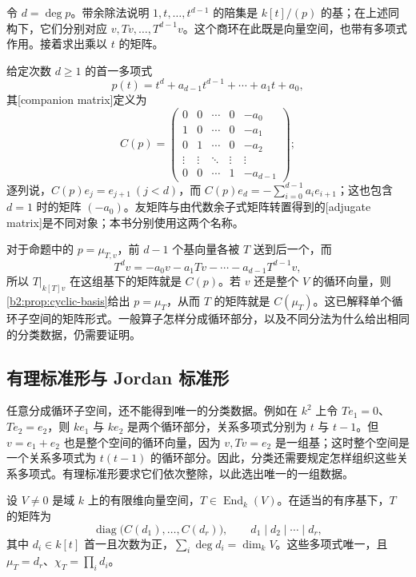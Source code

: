 令 \(d=\deg p\)。带余除法说明 \(1,t,\ldots,t^{d-1}\) 的陪集是 \(k[t]/(p)\) 的基；在上述同构下，它们分别对应 \(v,Tv,\ldots,T^{d-1}v\)。这个商环在此既是向量空间，也带有多项式作用。接着求出乘以 \(t\) 的矩阵。

\ProseParagraphBreak
给定次数 \(d\ge1\) 的首一多项式
\[
	p(t)=t^d+a_{d-1}t^{d-1}+\cdots+a_1t+a_0,
\]
其[companion matrix]定义为
\[
	C(p)=
	\begin{pmatrix}
		0&0&\cdots&0&-a_0\\
		1&0&\cdots&0&-a_1\\
		0&1&\cdots&0&-a_2\\
		\vdots&\vdots&\ddots&\vdots&\vdots\\
		0&0&\cdots&1&-a_{d-1}
	\end{pmatrix};
\]
逐列说，\(C(p)e_j=e_{j+1}\ (j<d)\)，而 \(C(p)e_d=-\sum_{i=0}^{d-1}a_ie_{i+1}\)；这也包含 \(d=1\) 时的矩阵 \((-a_0)\)。友矩阵与由代数余子式矩阵转置得到的[adjugate matrix]是不同对象；本书分别使用这两个名称。

\ProseParagraphBreak
对于命题中的 \(p=\mu_{T,v}\)，前 \(d-1\) 个基向量各被 \(T\) 送到后一个，而
\[
	T^dv=-a_0v-a_1Tv-\cdots-a_{d-1}T^{d-1}v,
\]
所以 \(T|_{k[T]v}\) 在这组基下的矩阵就是 \(C(p)\)。若 \(v\) 还是整个 \(V\) 的循环向量，则\cref{b2:prop:cyclic-basis}给出 \(p=\mu_T\)，从而 \(T\) 的矩阵就是 \(C(\mu_T)\)。这已解释单个循环子空间的矩阵形式。一般算子怎样分成循环部分，以及不同分法为什么给出相同的分类数据，仍需要证明。

\subsection{有理标准形与 Jordan 标准形}
\label{b2:subsec:0104:03}

任意分成循环子空间，还不能得到唯一的分类数据。例如在 \(k^2\) 上令 \(Te_1=0\)、\(Te_2=e_2\)，则 \(ke_1\) 与 \(ke_2\) 是两个循环部分，关系多项式分别为 \(t\) 与 \(t-1\)。但 \(v=e_1+e_2\) 也是整个空间的循环向量，因为 \(v,Tv=e_2\) 是一组基；这时整个空间是一个关系多项式为 \(t(t-1)\) 的循环部分。因此，分类还需要规定怎样组织这些关系多项式。有理标准形要求它们依次整除，以此选出唯一的一组数据。

\begin{claim}[有理标准形]\label{b2:claim:rational-canonical-goal}
	设 \(V\ne0\) 是域 \(k\) 上的有限维向量空间，\(T\in\operatorname{End}_k(V)\)。在适当的有序基下，\(T\) 的矩阵为
	\[
		\operatorname{diag}\bigl(C(d_1),\ldots,C(d_r)\bigr), \qquad d_1\mid d_2\mid\cdots\mid d_r,
	\]
	其中 \(d_i\in k[t]\) 首一且次数为正，\(\sum_i\deg d_i=\dim_k V\)。这些多项式唯一，且 \(\mu_T=d_r\)、\(\chi_T=\prod_i d_i\)。
\end{claim}

